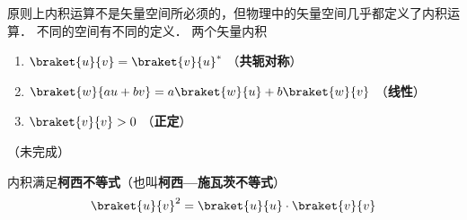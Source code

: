 

原则上内积运算不是矢量空间所必须的，但物理中的矢量空间几乎都定义了内积运算． 不同的空间有不同的定义． 两个矢量内积

\begin{enumerate}
\item $\braket{u}{v} = \braket{v}{u}^*$ （\textbf{共轭对称}）
\item $\braket{w}{a u + b v} = a\braket{w}{u} + b\braket{w}{v}$ （\textbf{线性}）
\item $\braket{v}{v} > 0$ （\textbf{正定}）
\end{enumerate}

（未完成）

内积满足\textbf{柯西不等式}（也叫\textbf{柯西—施瓦茨不等式}）
\begin{equation}
\braket{u}{v}^2 = \braket{u}{u} \cdot \braket{v}{v}
\end{equation}
